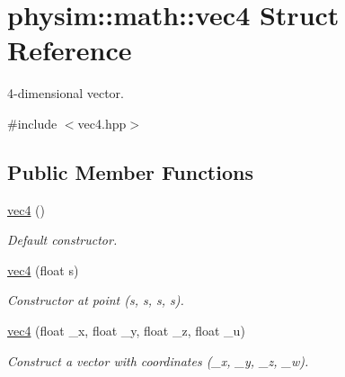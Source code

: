 \hypertarget{structphysim_1_1math_1_1vec4}{}\section{physim\+:\+:math\+:\+:vec4 Struct Reference}
\label{structphysim_1_1math_1_1vec4}


4-\/dimensional vector.  




{\ttfamily \#include $<$vec4.\+hpp$>$}

\subsection*{Public Member Functions}
\begin{DoxyCompactItemize}
\item 
\mbox{\label{structphysim_1_1math_1_1vec4_ac0e47addb2c98b626d75a2403db2f2b8}} 
\hyperlink{structphysim_1_1math_1_1vec4_ac0e47addb2c98b626d75a2403db2f2b8}{vec4} ()
\begin{DoxyCompactList}\small\item\em Default constructor. \end{DoxyCompactList}\item 
\mbox{\label{structphysim_1_1math_1_1vec4_a8f9b3abd508f03a3e178af1f71dac58c}} 
\hyperlink{structphysim_1_1math_1_1vec4_a8f9b3abd508f03a3e178af1f71dac58c}{vec4} (float s)
\begin{DoxyCompactList}\small\item\em Constructor at point ({\itshape s}, {\itshape s}, {\itshape s}, {\itshape s}). \end{DoxyCompactList}\item 
\mbox{\label{structphysim_1_1math_1_1vec4_a8bbbded70cdefd4f729bab8305009cb4}} 
\hyperlink{structphysim_1_1math_1_1vec4_a8bbbded70cdefd4f729bab8305009cb4}{vec4} (float \+\_\+x, float \+\_\+y, float \+\_\+z, float \+\_\+u)
\begin{DoxyCompactList}\small\item\em Construct a vector with coordinates ({\itshape \+\_\+x}, {\itshape \+\_\+y}, {\itshape \+\_\+z}, {\itshape \+\_\+w}). \end{DoxyCompactList}\item 
\mbox{\label{structphysim_1_1math_1_1vec4_a23ecd33ac90b6f1200643da762bfbb7c}} 

\end{DoxyCompactItemize}
